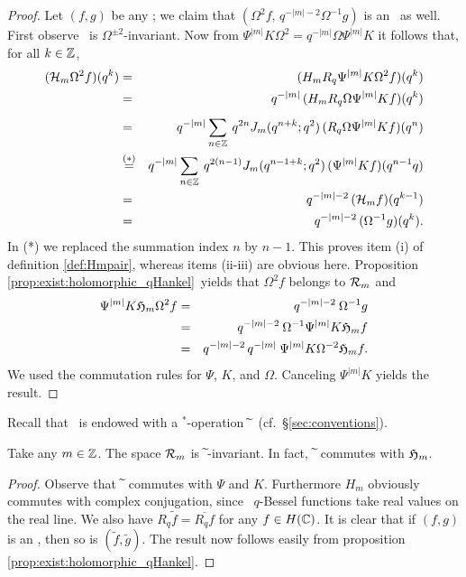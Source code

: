 \begin{proof}
Let $(f,g)$ be any \Hmpair\@; we claim that
$(\Omega^2 f,\, q^{-|m|-2}\Omega^{-1} g)$ is an \Hmpair\ as well.
First observe \Swqbis\ is $\Omega^{\pm 2}$-invariant.
Now from $\Psi^{|m|} K \Omega^2 = q^{-|m|} \Omega \Psi^{|m|} K$
it follows that, for all $k\in \mathbb{Z}$,
\begin{eqnarray*}
  (\auxH{m} \Omega^2 f)(q^k)
&=&
  (H_m R_q \Psi^{|m|} K \Omega^2 f)(q^k)
\\&=&
   q^{-|m|}\,(H_m R_q \Omega \Psi^{|m|} K f)(q^k)
\\&=& \vertXL
  q^{-|m|} \sum_{n\in \ZZ} \: q^{2n} \J{m}{q^{n+k}}\,(R_q \Omega \Psi^{|m|} K f)(q^n)
\\&\stackrel{(*)}{=}&
  q^{-|m|} \sum_{n\in \ZZ} \: q^{2(n-1)} \J{m}{q^{n-1+k}}\,(\Psi^{|m|} K f)(q^{n-1} q)
\\&=&
  q^{-|m|-2} \, (\auxH{m} f)(q^{k-1})
\\&=&
  q^{-|m|-2} \, (\Omega^{-1} g)(q^k).
\end{eqnarray*}
In (*) we replaced the summation index $n$ by $n-1$.
This proves item (i) of definition \ref{def:Hmpair}, whereas items (ii-iii)
are obvious here. Proposition \ref{prop:exist:holomorphic_qHankel}\ yields that
$\Omega^2 f$ belongs to ${\mathcal R}_{m}$ and
\begin{eqnarray*}
  \Psi^{|m|} K \mathfrak{H}_{m} \Omega^2 f
&=&
  q^{-|m|-2} \: \Omega^{-1} g
\\&=&
  q^{-|m|-2} \: \Omega^{-1} \Psi^{|m|} K \mathfrak{H}_{m} f
\\&=&
  q^{-|m|-2} \, q^{-|m|} \: \Psi^{|m|} K \Omega^{-2} \mathfrak{H}_{m} f.
\end{eqnarray*}
We used the commutation rules for $\Psi$, $K$, and $\Omega$.
Canceling $\Psi^{|m|} K$ yields the result.
\end{proof}
\vspace{2ex}



Recall that \HC\ is endowed with a $^*$-operation $\widetilde{\:}\,$ (cf.\ \S\ref{sec:conventions}).

\begin{prop} \label{prop:qHankel:tilde}
Take any\/ $m\in\mathbb{Z}$. The space\/ ${\mathcal R}_{m}$ is\/ $\widetilde{\:}$-invariant.
In fact, $\widetilde{\:}$ commutes with\/ $\mathfrak{H}_{m}$.
\end{prop}

\begin{proof}
Observe that $\widetilde{\:}$ commutes with $\Psi$ and $K$.
Furthermore $H_m$ obviously commutes with complex conjugation,
since \little\ $q$-Bessel functions take real values on the real line.
We also have $R_q \tilde{f} = \overline{R_q f}$ for any $f\in H(\mathbb{C})$.
It is clear that if $(f,g)$ is an \Hmpair, then so is $(\tilde{f},\tilde{g})$.
The result now follows easily from proposition \ref{prop:exist:holomorphic_qHankel}.
\end{proof}



